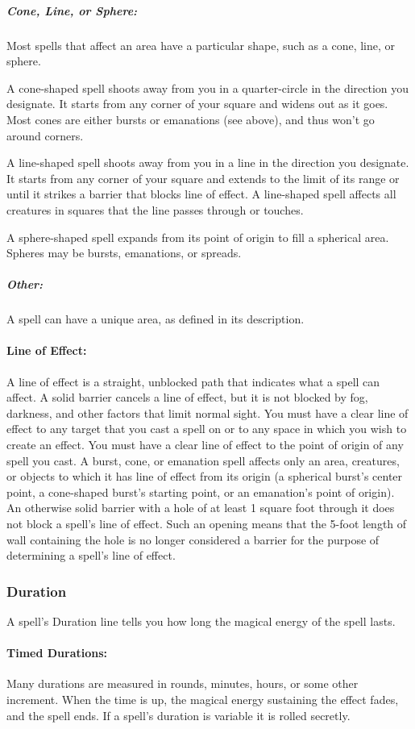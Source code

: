\subparagraph{Cone, Line, or Sphere:} Most spells that affect an area have a particular shape, such as a cone, line, or sphere. 

A cone-shaped spell shoots away from you in a quarter-circle in the direction you designate. 
It starts from any corner of your square and widens out as it goes. 
Most cones are either bursts or emanations (see above), and thus won't go around corners.

A line-shaped spell shoots away from you in a line in the direction you designate. 
It starts from any corner of your square and extends to the limit of its range or until it strikes a barrier that blocks line of effect. 
A line-shaped spell affects all creatures in squares that the line passes through or touches.

A sphere-shaped spell expands from its point of origin to fill a spherical area. Spheres may be bursts, emanations, or spreads.

\subparagraph{Other:} A spell can have a unique area, as defined in its description.

\paragraph{Line of Effect:} A line of effect is a straight, unblocked path that indicates what a spell can affect. 
A solid barrier cancels a line of effect, but it is not blocked by fog, darkness, and other factors that limit normal sight. 
You must have a clear line of effect to any target that you cast a spell on or to any space in which you wish to create an effect. 
You must have a clear line of effect to the point of origin of any spell you cast.
A burst, cone, or emanation spell affects only an area, creatures, or objects to which it has line of effect from its origin (a spherical burst's center point, a cone-shaped burst's starting point, or an emanation's point of origin). 
An otherwise solid barrier with a hole of at least 1 square foot through it does not block a spell's line of effect. 
Such an opening means that the 5-foot length of wall containing the hole is no longer considered a barrier for the purpose of determining a spell's line of effect.

\subsubsection{Duration}
A spell's Duration line tells you how long the magical energy of the spell lasts.

\paragraph{Timed Durations:} Many durations are measured in rounds, minutes, hours, or some other increment. When the time is up, the magical energy sustaining the effect fades, and the spell ends. If a spell's duration is variable it is rolled secretly.

